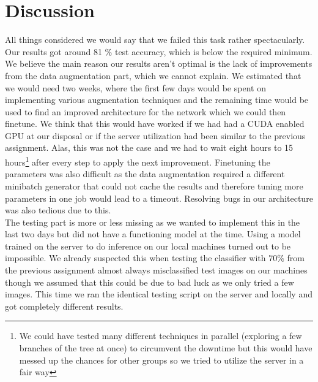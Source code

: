 \section{Discussion}
All things considered we would say that we failed this task rather spectacularly. Our results got around 81 \% test accuracy, which is below the required minimum. We believe the main reason our results aren't optimal is the lack of improvements from the data augmentation part, which we cannot explain. We estimated that we would need two weeks, where the first few days would be spent on implementing various augmentation techniques and the remaining time would be used to find an improved architecture for the network which we could then finetune. We think that this would have worked if we had had a CUDA enabled GPU at our disposal or if the server utilization had been similar to the previous assignment. Alas, this was not the case and we had to wait eight hours to 15 hours\footnote{We could have tested many different techniques in parallel (exploring a few branches of the tree at once) to circumvent the downtime but this would have messed up the chances for other groups so we tried to utilize the server in a fair way} after every step to apply the next improvement. Finetuning the parameters was also difficult as the data augmentation required a different minibatch generator that could not cache the results and therefore tuning more parameters in one job would lead to a timeout. Resolving bugs in our architecture was also tedious due to this. 
\\
The testing part is more or less missing as we wanted to implement this in the last two days but did not have a functioning model at the time. Using a model trained on the server to do inference on our local machines turned out to be impossible. We already suspected this when testing the classifier with $70\%$ from the previous assignment almost always misclassified test images on our machines though we assumed that this could be due to bad luck as we only tried a few images. This time we ran the identical testing script on the server and locally and got completely different results.  

